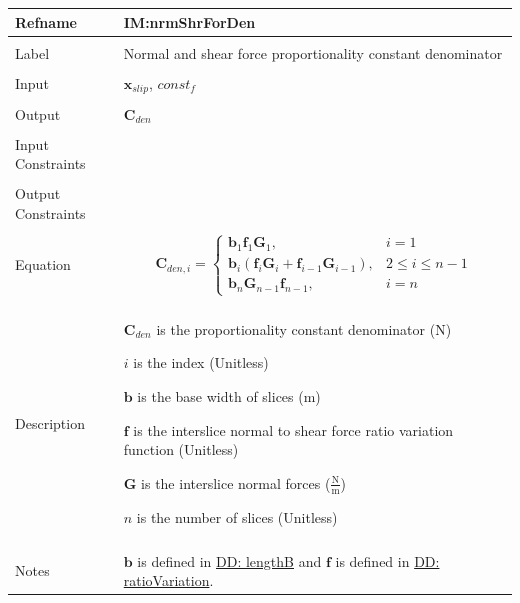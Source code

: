 \documentclass[12pt]{article}
\begin{document}
\vspace{\baselineskip}
\noindent
\begin{minipage}{\textwidth}
\begin{tabular}{>{\raggedright}p{}>{\raggedright\arraybackslash}p{}}
\toprule \textbf{Refname} & \textbf{IM:nrmShrForDen}
\label{IM:nrmShrForDen}
\\ \midrule \\
Label & Normal and shear force proportionality constant denominator
        
\\ \midrule \\
Input & ${\mathbf{x}_{slip}}$, $const_f$
        
\\ \midrule \\
Output & ${\mathbf{C}_{den}}$
         
\\ \midrule \\
Input Constraints & 
\\ \midrule \\
Output Constraints & 
\\ \midrule \\
Equation & \begin{displaymath}
           {\mathbf{C}_{den,i}}=\begin{cases}
                                {\mathbf{b}}_{1} {\mathbf{f}}_{1} {\mathbf{G}}_{1}, & i=1\\
{\mathbf{b}}_{i} \left({\mathbf{f}}_{i} {\mathbf{G}}_{i}+{\mathbf{f}}_{i-1} {\mathbf{G}}_{i-1}\right), & 2\leq{}i\leq{}n-1\\
{\mathbf{b}}_{n} {\mathbf{G}}_{n-1} {\mathbf{f}}_{n-1}, & i=n
                                \end{cases}
           \end{displaymath}
\\ \midrule \\
Description & \begin{symbDescription}
              \item{${\mathbf{C}_{den}}$ is the proportionality constant denominator (N)}
              \item{$i$ is the index (Unitless)}
              \item{$\mathbf{b}$ is the base width of slices (m)}
              \item{$\mathbf{f}$ is the interslice normal to shear force ratio variation function (Unitless)}
              \item{$\mathbf{G}$ is the interslice normal forces ($\frac{\text{N}}{\text{m}}$)}
              \item{$n$ is the number of slices (Unitless)}
              \end{symbDescription}
\\ \midrule \\
Notes & $\mathbf{b}$ is defined in \hyperref[DD:lengthB]{DD: lengthB} and $\mathbf{f}$ is defined in \hyperref[DD:ratioVariation]{DD: ratioVariation}.
        

\end{tabular}
\end{minipage}
\end{document}
